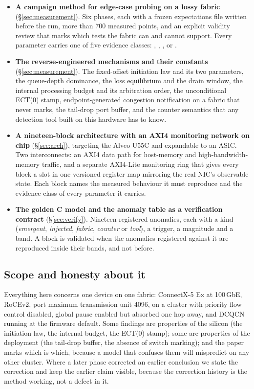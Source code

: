 \begin{itemize}
  \item \textbf{A campaign method for edge-case probing on a lossy fabric}
    (\S\ref{sec:measurement}). Six phases, each with a frozen expectations
    file written before the run, more than 700 measured points, and an explicit
    validity review that marks which tests the fabric can and cannot support.
    Every parameter carries one of five evidence classes: \evdoc{}, \evdrv{},
    \evcal{}, \evdecl{} or \evinf{}.
  \item \textbf{The reverse-engineered mechanisms and their constants}
    (\S\ref{sec:measurement}). The fixed-offset initiation law and its two
    parameters, the queue-depth dominance, the loss equilibrium and the drain
    window, the internal processing budget and its arbitration order, the
    unconditional ECT(0) stamp, endpoint-generated congestion notification on a
    fabric that never marks, the tail-drop port buffer, and the counter
    semantics that any detection tool built on this hardware has to know.
  \item \textbf{A nineteen-block architecture with an AXI4 monitoring network
    on chip} (\S\ref{sec:arch}), targeting the Alveo U55C and expandable to an
    ASIC. Two interconnects: an AXI4 data path for host-memory and
    high-bandwidth-memory traffic, and a separate AXI4-Lite monitoring ring
    that gives every block a slot in one versioned register map mirroring the
    real NIC's observable state. Each block names the measured behaviour it
    must reproduce and the evidence class of every parameter it carries.
  \item \textbf{The golden C model and the anomaly table as a verification
    contract} (\S\ref{sec:verify}). Nineteen registered anomalies, each with a
    kind (\textit{emergent}, \textit{injected}, \textit{fabric},
    \textit{counter} or \textit{tool}), a trigger, a magnitude and a band. A
    block is validated when the anomalies registered against it are reproduced
    inside their bands, and not before.
\end{itemize}

\subsection{Scope and honesty about it}

Everything here concerns one device on one fabric: ConnectX-5 Ex at 100\,GbE,
RoCEv2, port maximum transmission unit 4096, on a cluster with priority flow
control disabled, global pause enabled but absorbed one hop away, and DCQCN
running at the firmware default. Some findings are properties of the silicon
(the initiation law, the internal budget, the ECT(0) stamp); some are
properties of the deployment (the tail-drop buffer, the absence of switch
marking); and the paper marks which is which, because a model that confuses
them will mispredict on any other cluster. Where a later phase corrected an
earlier conclusion we state the correction and keep the earlier claim visible,
because the correction history is the method working, not a defect in it.

